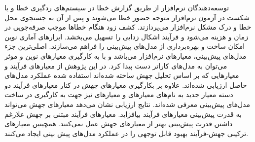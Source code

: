 
 توسعه‌دهندگان نرم‌افزار از طریق گزارش خطا در سیستم­‌های ردگیری خطا و یا شکست در آزمون نرم‌‌افزار متوجه حضور خطا می‌شوند و پس از آن به جستجوی محل خطا و درک مشکل  نرم‌‌افزار می‌‌پردازند. کشف زود هنگام خطاها موجب صرفه‌‌جویی در زمان و هزینه می­‌شود و فرآیند اشکال زدایی را تسهیل می‌­بخشد. ابزارهای آماری نوین امکان ساخت و بهره‌‌برداری از مدل‌های پیش‌بینی را فراهم می‌سازند. اصلی‌ترین جزء مدل‌های پیش‌بینی، معیارهای نرم‌افزار می‌باشد و با به کارگیری معیارهای نوین و موثر می‌توان به مدل‌های کاراتر دست پیدا کرد. در این پژوهش از معیارهای فرآیند و معیارهایی که بر اساس تحلیل جهش ساخته شده‌اند استفاده شده عملکرد مدل‌های حاصل ارزیابی شده‌اند. علاوه بر بکارگیری معیارهای جهش در کنار معیارهای فرآیند دو دسته معیار جدید به نام‌های معیارهای  و معیارهای  نیز جهت به کارگیری در ساخت مدل‌های پیش‌بینی معرفی شده‌اند. نتایج ارزیابی نشان می‌دهد معیارهای جهش می‌تواند به قدرت پیش‌بینی معیارهای فرآیند بیافزاید. معیارهای فرآیند مبتنی بر جهش علارغم داشتن قدرت پیش‌بینی بهتر از معیارهای جهش عمل نمی‌کنند. همچینین معیارهای ترکیبی جهش-فرآیند بهبود قابل توجهی را در عملکرد مدل‌های پیش بینی ایجاد می‌کنند. 

